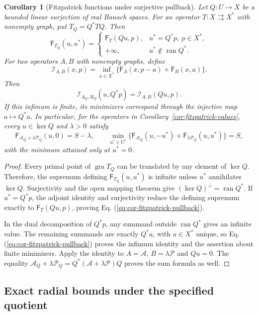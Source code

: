 \documentclass[11pt]{article}
\newcommand{\gra}{\operatorname{gra}}
\newtheorem{corollary}{Corollary}
\theoremstyle{definition}
\theoremstyle{remark}
\begin{document}
\begin{corollary}[Fitzpatrick functions under surjective pullback]
\label{cor:fitzpatrick-pullback}
Let $Q:U\to X$ be a bounded linear surjection of real Banach spaces. For an operator $T:X\rightrightarrows X^*$ with nonempty graph, put $T_Q=Q^*TQ$. Then
\begin{equation}
\mathsf F_{T_Q}(u,u^*)=
\begin{cases}
\mathsf F_T(Qu,p),&u^*=Q^*p,\ p\in X^*,\\
+\infty,&u^*\notin\operatorname{ran}Q^*.
\end{cases}
\label{eq:cor-fitzpatrick-pullback}
\end{equation}
For two operators $A,B$ with nonempty graphs, define
\[
\mathcal I_{A,B}(x,p)=\inf_{a\in X^*}\{\mathsf F_A(x,p-a)+\mathsf F_B(x,a)\}.
\]
Then
\[
\mathcal I_{A_Q,B_Q}(u,Q^*p)=\mathcal I_{A,B}(Qu,p).
\]
If this infimum is finite, its minimizers correspond through the injective map $a\mapsto Q^*a$. In particular, for the operators in Corollary~\ref{cor:fitzpatrick-values}, every $u\in\ker Q$ and $\lambda>0$ satisfy
\[
\mathsf F_{\mathcal A_Q+\lambda\mathcal P_Q}(u,0)=S-\lambda,
\qquad
\min_{u^*\in U^*}\{\mathsf F_{\mathcal A_Q}(u,-u^*)+\mathsf F_{\lambda\mathcal P_Q}(u,u^*)\}=S,
\]
with the minimum attained only at $u^*=0$.
\end{corollary}
\begin{proof}
Every primal point of $\gra T_Q$ can be translated by any element of $\ker Q$. Therefore, the supremum defining $\mathsf F_{T_Q}(u,u^*)$ is infinite unless $u^*$ annihilates $\ker Q$. Surjectivity and the open mapping theorem give $(\ker Q)^\perp=\operatorname{ran}Q^*$. If $u^*=Q^*p$, the adjoint identity and surjectivity reduce the defining supremum exactly to $\mathsf F_T(Qu,p)$, proving Eq. (\ref{eq:cor-fitzpatrick-pullback}).

In the dual decomposition of $Q^*p$, any summand outside $\operatorname{ran}Q^*$ gives an infinite value. The remaining summands are exactly $Q^*a$, with $a\in X^*$ unique, so Eq. (\ref{eq:cor-fitzpatrick-pullback}) proves the infimum identity and the assertion about finite minimizers. Apply the identity to $A=\mathcal A$, $B=\lambda\mathcal P$ and $Qu=0$. The equality $\mathcal A_Q+\lambda\mathcal P_Q=Q^*(\mathcal A+\lambda\mathcal P)Q$ proves the sum formula as well.
\end{proof}

\subsection{Exact radial bounds under the specified quotient}
\label{subsec:appendix-exact-radial}
\end{document}
